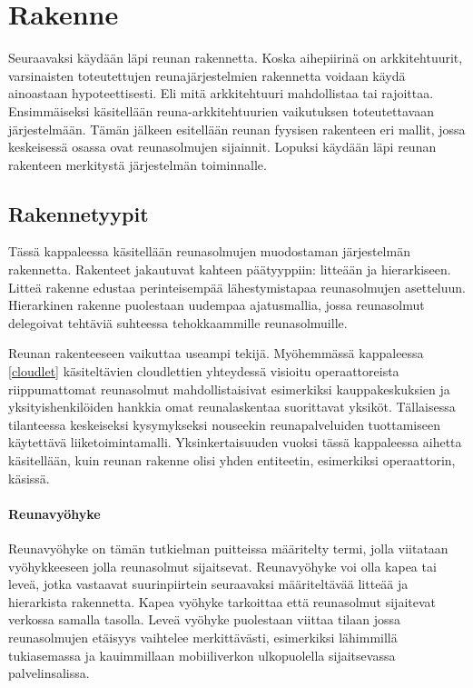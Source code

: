 \section{Rakenne} \label{rakenne}
Seuraavaksi käydään läpi reunan rakennetta. Koska aihepiirinä on arkkitehtuurit, varsinaisten toteutettujen reunajärjestelmien rakennetta voidaan käydä ainoastaan hypoteettisesti. 
Eli mitä arkkitehtuuri mahdollistaa tai rajoittaa.
Ensimmäiseksi käsitellään reuna-arkkitehtuurien vaikutuksen toteutettavaan järjestelmään.
Tämän jälkeen esitellään reunan fyysisen rakenteen eri mallit, jossa keskeisessä osassa ovat reunasolmujen sijainnit.
Lopuksi käydään läpi reunan rakenteen merkitystä järjestelmän toiminnalle.



\subsection{Rakennetyypit}
Tässä kappaleessa käsitellään reunasolmujen muodostaman järjestelmän rakennetta. Rakenteet jakautuvat kahteen päätyyppiin: litteään ja hierarkiseen.
Litteä rakenne edustaa perinteisempää lähestymistapaa reunasolmujen asetteluun. Hierarkinen rakenne puolestaan uudempaa ajatusmallia, jossa reunasolmut delegoivat tehtäviä suhteessa tehokkaammille reunasolmuille. 

Reunan rakenteeseen vaikuttaa useampi tekijä. Myöhemmässä kappaleessa \ref{cloudlet} käsiteltävien cloudlettien yhteydessä visioitu operaattoreista riippumattomat reunasolmut mahdollistaisivat esimerkiksi kauppakeskuksien ja yksityishenkilöiden hankkia omat reunalaskentaa suorittavat yksiköt. Tällaisessa tilanteessa keskeiseksi kysymykseksi nouseekin reunapalveluiden tuottamiseen käytettävä liiketoimintamalli. Yksinkertaisuuden vuoksi tässä kappaleessa aihetta käsitellään, kuin reunan rakenne olisi yhden entiteetin, esimerkiksi operaattorin, käsissä. 

\paragraph*{Reunavyöhyke}
Reunavyöhyke on tämän tutkielman puitteissa määritelty termi, jolla viitataan vyöhykkeeseen jolla reunasolmut sijaitsevat. Reunavyöhyke voi olla kapea tai leveä, jotka vastaavat suurinpiirtein seuraavaksi määriteltävää litteää ja hierarkista rakennetta. Kapea vyöhyke tarkoittaa että reunasolmut sijaitevat verkossa samalla tasolla. Leveä vyöhyke puolestaan viittaa tilaan jossa reunasolmujen etäisyys vaihtelee merkittävästi, esimerkiksi lähimmillä tukiasemassa ja kauimmillaan mobiiliverkon ulkopuolella sijaitsevassa palvelinsalissa.

